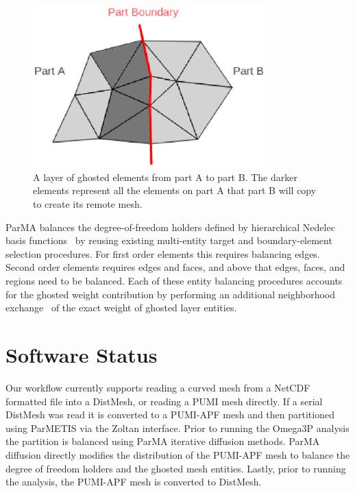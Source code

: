 \documentclass[a4paper]{article}
\begin{document}
\begin{figure}[ht]
\centering
\includegraphics[width=0.8\textwidth]{ghost.eps} 
\caption{\label{fig:ghost3} A layer of ghosted elements from part A to part B. The darker elements represent all the elements on part A that part B will copy to create its remote mesh.}
\end{figure}

ParMA balances the degree-of-freedom holders defined by 
hierarchical Nedelec basis functions~\cite{ko2010advances,ingelstrom2006new} by
reusing existing multi-entity target and boundary-element selection
procedures.
For first order elements this requires balancing edges.
Second order elements requires edges and faces, and above that edges, faces, and
regions need to be balanced.
Each of these entity balancing procedures accounts for the ghosted weight
contribution by performing an additional neighborhood
exchange~\cite{ibanez2014hybrid} of the exact weight of ghosted layer entities.

\section{Software Status}\label{sec:software}
Our workflow currently supports reading a curved mesh from a NetCDF formatted file
into a DistMesh, or reading a PUMI mesh directly.
If a serial DistMesh was read it is converted to a PUMI-APF mesh and then 
partitioned using ParMETIS via the Zoltan interface.
Prior to running the Omega3P analysis the partition is balanced using ParMA
iterative diffusion methods.
ParMA diffusion directly modifies the distribution of the PUMI-APF mesh to
balance the degree of freedom holders and the ghosted mesh entities.
Lastly, prior to running the analysis, the PUMI-APF mesh is converted to
DistMesh.
\end{document}

